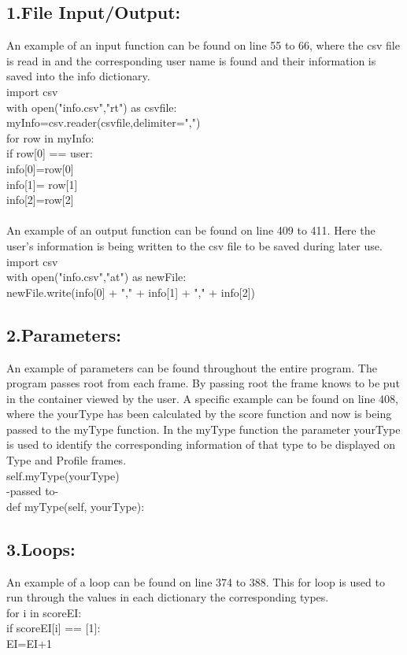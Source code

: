 \documentclass[11pt]{article}%
\begin{document}
\subsection*{1.File Input/Output:}
An example of an input function can be found on line 55 to 66, where the csv file is read in and the corresponding user name is found and their information is saved into the info dictionary.\\
\indent import csv\\
\indent \indent with open("info.csv","rt") as csvfile:\\
\indent \indent myInfo=csv.reader(csvfile,delimiter=",")\\
\indent \indent for row in myInfo:\\
\indent \indent \indent if row[0] == user:\\
\indent \indent \indent \indent info[0]=row[0]\\
\indent \indent \indent \indent info[1]= row[1]\\
\indent \indent \indent \indent info[2]=row[2]\\
\\ \indent An example of an output function can be found on line 409 to 411. Here the user’s information is being written to the csv file to be saved during later use.\\
\indent import csv\\
\indent \indent with open("info.csv","at") as newFile:\\
\indent \indent newFile.write(info[0] + "," + info[1] + "," + info[2])
\subsection*{2.Parameters:}
An example of parameters can be found throughout the entire program. The program passes root from each frame. By passing root the frame knows to be put in the container viewed by the user. A specific example can be found on line 408, where the yourType has been calculated by the score function and now is being passed to the myType function. In the myType function the parameter yourType is used to identify the corresponding information of that type to be displayed on Type and Profile frames.\\
\indent self.myType(yourType)\\
\indent\indent -passed to-\\
\indent def myType(self, yourType):
\subsection*{3.Loops:}
An example of a loop can be found on line 374 to 388. This for loop is used to run through the values in each dictionary the corresponding types.\\
\indent for i in scoreEI:\\
\indent \indent if scoreEI[i] == [1]:\\
\indent \indent\indent EI=EI+1
\end{document}

